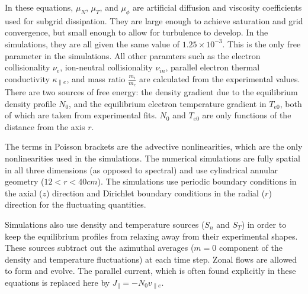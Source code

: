 \documentclass[twocolumn,showpacs,preprintnumbers,amsmath,amssymb]{revtex4}
\def\para{\parallel}
\newcommand{\vpe}{v_{\parallel e}}
\newcommand{\nue}{\nu_{e}}
\newcommand{\nuin}{\nu_{in}}
\newcommand{\kpe}{\kappa_{\parallel e}}
\newcommand{\fmie}{\frac{m_i}{m_e}}
\begin{document}
In these equations, $\mu_N$, $\mu_T$, and $\mu_\phi$ are artificial diffusion and viscosity coefficients used for subgrid dissipation. They are large enough to achieve saturation
and grid convergence, but small enough to allow for turbulence to develop. In the simulations, they are all given the same value of $1.25 \times 10^{-3}$. This is the only free
parameter in the simulations. All other paramters such as the electron collisionality $\nue$, ion-neutral
collisionality $\nuin$, parallel electron thermal conductivity $\kpe$, and mass ratio $\fmie$ are calculated from the experimental values.
There are two sources of free energy: the density gradient due to the equilibrium density profile $N_0$, and the equilibrium electron temperature gradient in $T_{e0}$, both of which are
taken from experimental fits. $N_0$ and $T_{e0}$ are only functions of the distance from the axis $r$. 

The terms in Poisson brackets are the advective nonlinearities, which are the only nonlinearities used in the simulations.
The numerical simulations are fully spatial in all three dimensions (as opposed to spectral) and use cylindrical annular geometry ($12<r<40 cm$).
The simulations use periodic boundary conditions in the axial ($z$) direction and Dirichlet boundary
conditions in the radial ($r$) direction for the fluctuating quantities. 

Simulations also use density and temperature sources ($S_n$ and $S_T$) in order to keep the equilibrium profiles from relaxing away from their experimental shapes. 
These sources subtract out the azimuthal averages ($m=0$ component of the density and temperature fluctuations) at each time step. 
Zonal flows are allowed to form and evolve. The parallel current, which is often found explicitly in these equations is replaced here by $J_\para = - N_0 \vpe$. \\
\end{document}
